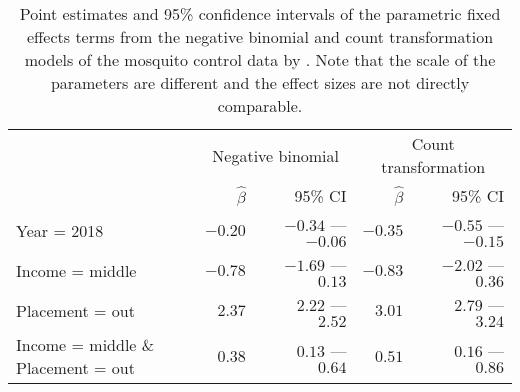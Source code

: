 \documentclass[11pt]{article}\usepackage[]{graphicx}\usepackage{xcolor}
\newcommand{\0}{{\mathbf{0}}}
\begin{document}
\begin{table}
  \centering
  \caption{
    Point estimates and 95\% confidence intervals of the parametric
    fixed effects terms from the negative binomial
    and count transformation models
    of the mosquito control data by \protect\citet{Juarez_2021}.
    Note that the scale of the parameters are different
    and the effect sizes are not directly comparable.
  }\label{tbl:mosquito-fe}

\begin{tabular}{@{}lrrrr@{}}
  \toprule
  & \multicolumn{2}{c}{Negative binomial} & \multicolumn{2}{c}{Count transformation} \\
 \cmidrule(lr){2-3} \cmidrule(lr){4-5} & $\widehat\beta$ & 95\% CI  & $\widehat\beta$ & 95\% CI  \\
 \midrule
Year = 2018 & $-0.20$ & $-0.34$ ---$-0.06$ & $-0.35$ & $-0.55$ ---$-0.15$ \\ 
  Income = middle & $-0.78$ & $-1.69$ ---$\phantom{-}0.13$ & $-0.83$ & $-2.02$ ---$\phantom{-}0.36$ \\ 
  Placement = out & $2.37$ & $\phantom{-}2.22$ ---$\phantom{-}2.52$ & $3.01$ & $\phantom{-}2.79$ ---$\phantom{-}3.24$ \\ 
  Income = middle \& Placement = out & $0.38$ & $\phantom{-}0.13$ ---$\phantom{-}0.64$ & $0.51$ & $\phantom{-}0.16$ ---$\phantom{-}0.86$ \\ 
   \bottomrule
\end{tabular}


\end{table}

\clearpage




\clearpage
\end{document}
